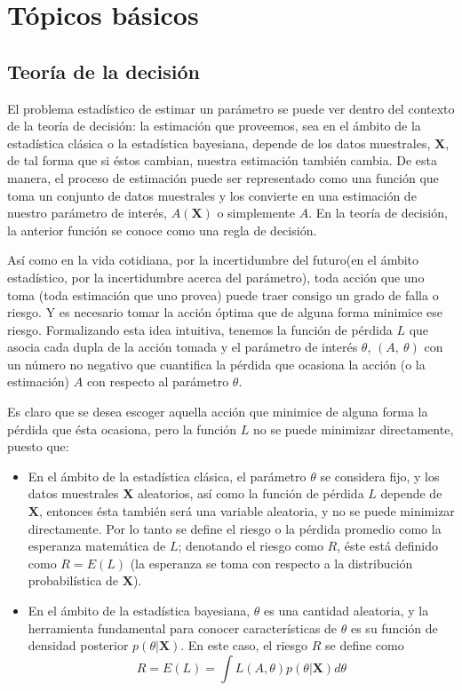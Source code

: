 
  
\chapter{Tópicos básicos}

\section{Teoría de la decisión}

El problema estadístico de estimar un parámetro se puede ver dentro del contexto de la teoría de decisión: la estimación que proveemos, sea en el ámbito de la estadística clásica o la estadística bayesiana, depende de los datos muestrales, $\mathbf{X}$, de tal forma que si éstos cambian, nuestra estimación también cambia. De esta manera, el proceso de estimación puede ser representado como una función que toma un conjunto de datos muestrales y los convierte en una estimación de nuestro parámetro de interés, $A(\mathbf{X})$ o simplemente $A$. En la teoría de decisión, la anterior función se conoce como una regla de decisión.

Así como en la vida cotidiana, por la incertidumbre del futuro(en el ámbito estadístico, por la incertidumbre acerca del parámetro), toda acción que uno toma (toda estimación que uno provea) puede traer consigo un grado de falla o riesgo. Y es necesario tomar la acción óptima que de alguna forma minimice ese riesgo. Formalizando esta idea intuitiva, tenemos la función de pérdida $L$ que asocia cada dupla de la acción tomada y el parámetro de interés $\theta$, $(A, \ \theta)$ con un número no negativo que cuantifica la pérdida que ocasiona la acción (o la estimación) $A$ con respecto al parámetro $\theta$.

Es claro que se desea escoger aquella acción que minimice de alguna forma la pérdida que ésta ocasiona, pero la función $L$ no se puede minimizar directamente, puesto que:
\begin{itemize}
    \item En el ámbito de la estadística clásica, el parámetro $\theta$ se considera fijo, y los datos muestrales $\mathbf{X}$ aleatorios, así como la función de pérdida $L$ depende de $\mathbf{X}$, entonces ésta también será una variable aleatoria, y no se puede minimizar directamente. Por lo tanto se define el riesgo o la pérdida promedio como la esperanza matemática de $L$; denotando el riesgo como $R$, éste está definido como $R=E(L)$ (la esperanza se toma con respecto a la distribución probabilística de $\mathbf{X}$).
    \item En el ámbito de la estadística bayesiana, $\theta$ es una cantidad aleatoria, y la herramienta fundamental para conocer características de $\theta$ es su función de densidad posterior $p(\theta|\mathbf{X})$. En este caso, el riesgo $R$ se define como
        \begin{equation*}
        R=E(L)=\int L(A, \theta)p(\theta|\mathbf{X})d\theta
        \end{equation*}
\end{itemize}

